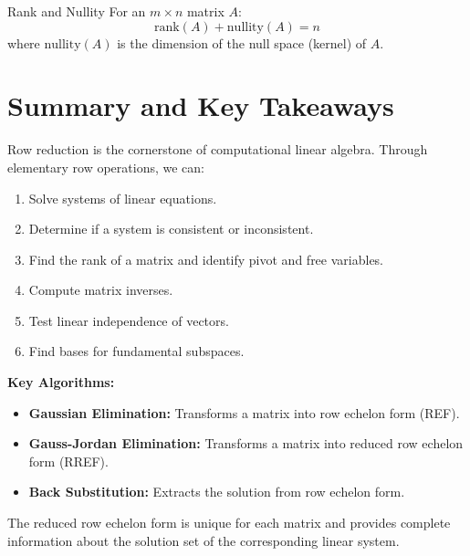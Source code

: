 \documentclass[12pt,a4paper]{article}
\newcommand{\rank}{\text{rank}}
\newcommand{\nullity}{\text{nullity}}
\begin{document}
	\begin{corollary}{Rank and Nullity}
		For an $m \times n$ matrix $A$:
		\[
		\rank(A) + \nullity(A) = n
		\]
		where $\nullity(A)$ is the dimension of the null space (kernel) of $A$.
	\end{corollary}
	
	\newpage
	
	\section{Summary and Key Takeaways}
	
	Row reduction is the cornerstone of computational linear algebra. Through elementary row operations, we can:
	
	\begin{enumerate}
		\item Solve systems of linear equations.
		\item Determine if a system is consistent or inconsistent.
		\item Find the rank of a matrix and identify pivot and free variables.
		\item Compute matrix inverses.
		\item Test linear independence of vectors.
		\item Find bases for fundamental subspaces.
	\end{enumerate}
	
	\textbf{Key Algorithms:}
	\begin{itemize}
		\item \textbf{Gaussian Elimination:} Transforms a matrix into row echelon form (REF).
		\item \textbf{Gauss-Jordan Elimination:} Transforms a matrix into reduced row echelon form (RREF).
		\item \textbf{Back Substitution:} Extracts the solution from row echelon form.
	\end{itemize}
	
	The reduced row echelon form is unique for each matrix and provides complete information about the solution set of the corresponding linear system.
	
\end{document}

